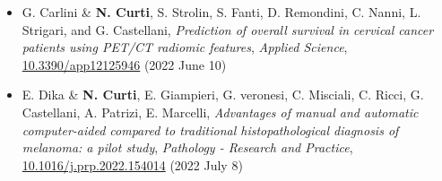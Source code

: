 \documentclass[a4paper,11pt]{article}
\newcommand{\itemicon}[2]{\item[{\texttt{[image: \#2]}}]}
\begin{document}
\begin{itemize}
  \itemicon{0.05}{article.png} G. Carlini \& \textbf{N. Curti}, S. Strolin, S. Fanti, D. Remondini, C. Nanni, L. Strigari, and G. Castellani, \emph{Prediction of overall survival in cervical cancer patients using PET/CT radiomic features}, \emph{Applied Science}, \url{10.3390/app12125946} (2022 June 10)

  \itemicon{0.05}{article.png} E. Dika \& \textbf{N. Curti}, E. Giampieri, G. veronesi, C. Misciali, C. Ricci, G. Castellani, A. Patrizi, E. Marcelli, \emph{Advantages of manual and automatic computer-aided compared to traditional histopathological diagnosis of melanoma: a pilot study}, \emph{Pathology - Research and Practice}, \url{10.1016/j.prp.2022.154014} (2022 July 8)

\end{itemize}








\end{document}
